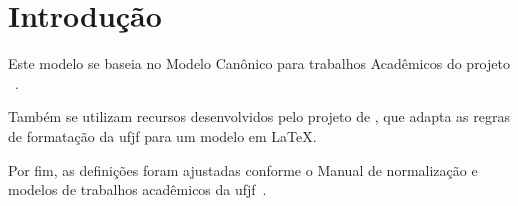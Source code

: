 \chapter{Introdução}%
\label{cap:introducao}

Este modelo se baseia no Modelo Canônico para trabalhos Acadêmicos do projeto \abnTeX~\cite{abntex2:2024}.

Também se utilizam recursos desenvolvidos pelo projeto de , que adapta as regras de formatação da \gls{ufjf} para um modelo em \LaTeX.

Por fim, as definições foram ajustadas conforme o Manual de normalização e modelos de trabalhos acadêmicos da \gls{ufjf}~\cite{cdd:2023}.
